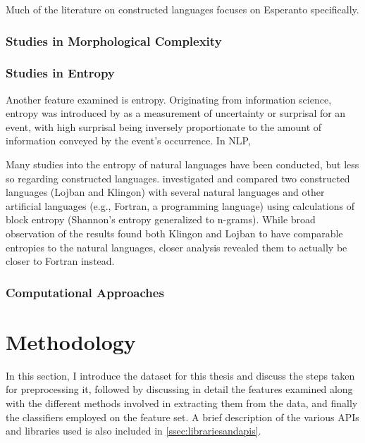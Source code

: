 \documentclass[12pt,a4paper]{article}
\numberwithin{figure}{section}
\numberwithin{table}{section}
\numberwithin{definition}{section}
\begin{document}
Much of the literature on constructed languages focuses on Esperanto specifically.

\subsubsection{Studies in Morphological Complexity}
\label{morphologicalcomplexitystudies}

\subsubsection{Studies in Entropy}
\label{entropystudies}

Another feature examined is entropy. Originating from information science, entropy was introduced by \textcite{Shannon1948book} as a measurement of uncertainty or surprisal for an event, with high surprisal being inversely proportionate to the amount of information conveyed by the event's occurrence. In NLP, 

Many studies into the entropy of natural languages have been conducted, but less so regarding constructed languages. \textcite{Smaha2015book} investigated and compared two constructed languages (Lojban and Klingon) with several natural languages and other artificial languages (e.g., Fortran, a programming language) using calculations of block entropy (Shannon's entropy generalized to n-grams). While broad observation of the results found both Klingon and Lojban to have comparable entropies to the natural languages, closer analysis revealed them to actually be closer to Fortran instead. 

\subsubsection{Computational Approaches}
\label{ssec:computationalapproaches}

\textcite{Oktafiani2024article} 

\newpage
\section{Methodology}
\label{sec:methodology}

In this section, I introduce the dataset for this thesis and discuss the steps taken for preprocessing it, followed by discussing in detail the features examined along with the different methods involved in extracting them from the data, and finally the classifiers employed on the feature set. A brief description of the various APIs and libraries used is also included in \ref{ssec:librariesandapis}. 
\end{document}
